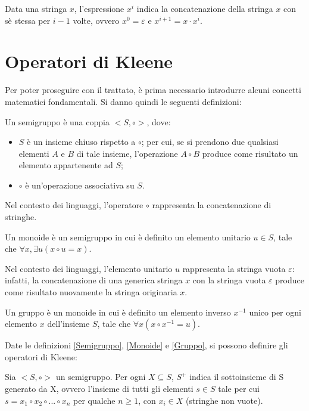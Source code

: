   Data una stringa \(x\), l'espressione \(x^i\) indica la concatenazione della stringa \(x\) con sè stessa per \(i-1\) volte, ovvero \(x^0 = \varepsilon\) e \(x^{i+1} = x\cdot x^{i}\).

  \section{Operatori di Kleene}
  Per poter proseguire con il trattato, è prima necessario introdurre alcuni concetti matematici fondamentali. Si danno quindi le seguenti definizioni:
  \begin{definition}[Semigruppo] \label{Semigruppo}
    Un semigruppo è una coppia \(<S, \circ >\), dove:
    \begin{itemize}
      \item \(S\) è un insieme chiuso rispetto a \(\circ\); per cui, se si prendono due qualsiasi elementi \(A\) e \(B\) di tale insieme, l'operazione \(A\circ B\) produce come risultato un elemento appartenente ad \(S\);
      \item \(\circ\) è un'operazione associativa su \(S\).
    \end{itemize}
  \end{definition}

  Nel contesto dei linguaggi, l'operatore \(\circ\) rappresenta la concatenazione di stringhe.
  
  \begin{definition}[Monoide] \label{Monoide}
    Un monoide è un semigruppo in cui è definito un elemento unitario \(u\in S\), tale che \(\forall x, \exists u(x\circ u = x)\).
  \end{definition}

  Nel contesto dei linguaggi, l'elemento unitario \(u\) rappresenta la stringa vuota \(\varepsilon\): infatti, la concatenazione di una generica stringa \(x\) con la stringa vuota \(\varepsilon\) produce come risultato nuovamente la stringa originaria \(x\). 

  \begin{definition}[Gruppo] \label{Gruppo}
    Un gruppo è un monoide in cui è definito un elemento inverso \(x^{-1}\) unico per ogni elemento \(x\) dell'insieme \(S\), tale che \(\forall x(x\circ x^{-1} = u)\).
  \end{definition}

  Date le definizioni \ref{Semigruppo}, \ref{Monoide} e \ref{Gruppo}, si possono definire gli operatori di Kleene:

  \begin{definition} 
    Sia \(<S, \circ>\) un semigruppo. Per ogni \(X\subseteq S\), \(S^+\) indica il sottoinsieme di S generato da X, ovvero l'insieme di tutti gli elementi \(s\in S\) tale per cui \(s=x_1\circ x_2\circ...\circ x_n\) per qualche \(n\geq 1\), con \(x_i\in X\) (stringhe non vuote).
  \end{definition}

